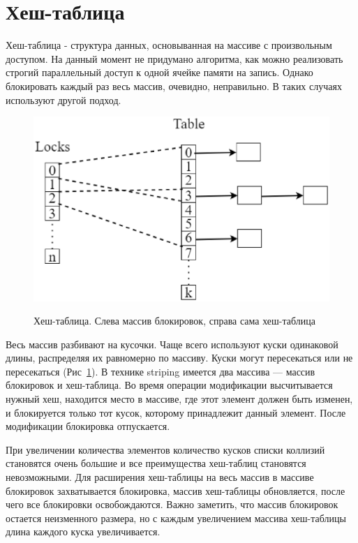 \documentclass[12pt]{report}
\begin{document}
{		\section{Хеш-таблица}
		\par Хеш-таблица - структура данных, основыванная на массиве с произвольным доступом. На данный момент не придумано алгоритма, как можно реализовать строгий параллельный доступ к одной ячейке памяти на запись. Однако блокировать каждый раз весь массив, очевидно, неправильно. В таких случаях используют другой подход.
		\begin{figure}[h]
			\begin{minipage}[h]{1\linewidth}
				\center \includegraphics[width=1\linewidth]{19} \\
			\end{minipage}
			\caption{Хеш-таблица. Слева массив блокировок, справа сама хеш-таблица}
			\label{pic:hashTable}
		\end{figure}
		\par Весь массив разбивают на кусочки. Чаще всего используют куски одинаковой длины, распределяя их равномерно по массиву. Куски могут пересекаться или не пересекаться (Рис~\ref{pic:hashTable}). В технике striping имеется два массива — массив блокировок и хеш-таблица. Во время операции модификации высчитывается нужный хеш, находится место в массиве, где этот элемент должен быть изменен, и блокируется только тот кусок, которому принадлежит данный элемент. После модификации блокировка отпускается.
		\par При увеличении количества элементов количество кусков списки коллизий становятся очень большие и все преимущества хеш-таблиц становятся невозможными. Для расширения хеш-таблицы на весь массив в массиве блокировок захватывается блокировка, массив хеш-таблицы обновляется, после чего все блокировки освобождаются. Важно заметить, что массив блокировок остается неизменного размера, но с каждым увеличением массива хеш-таблицы длина каждого куска увеличивается.
}
\end{document}

